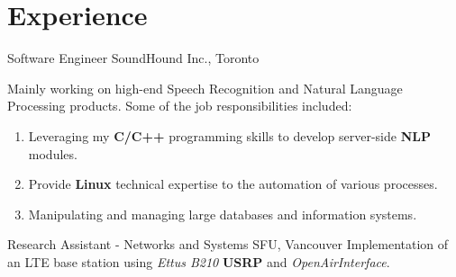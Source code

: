 \documentclass[letterpaper]{twentysecondcv} %
\begin{document}

\section{Experience}

\begin{twenty}

             {Software Engineer}
             {SoundHound Inc., Toronto}
             {Mainly working on high-end Speech Recognition and Natural Language Processing products. Some of the job responsibilities included:
             \begin{enumerate}
                 \item{Leveraging my \textbf{C/C++} programming skills to develop server-side \textbf{NLP} modules.}
                 \item{Provide \textbf{Linux} technical expertise to the automation of various processes.}
                 \item{Manipulating and managing large databases and information systems.}
             \end{enumerate}
             }

               {Research Assistant - Networks and Systems}
               {SFU, Vancouver}
               {Implementation of an LTE base station using \textit{Ettus B210} \textbf{USRP} and \textit{OpenAirInterface}.
               }


\end{twenty}
\end{document}
